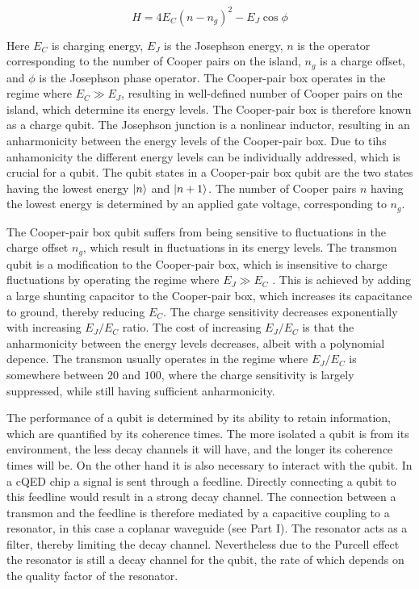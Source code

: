     \begin{equation}
      H=4 E_C (n - n_g)^2-E_J \cos \phi
      \label{eq:Cooper-pair box Hamiltonian}
    \end{equation}

    Here $E_C$ is charging energy, $E_J$ is the Josephson energy, $n$ is the operator corresponding to the number of Cooper pairs on the island, $n_g$ is a charge offset, and $\phi$ is the Josephson phase operator. The Cooper-pair box operates in the regime where $E_C \gg E_J$, resulting in well-defined number of Cooper pairs on the island, which determine its energy levels. The Cooper-pair box is therefore known as a charge qubit. The Josephson junction is a nonlinear inductor, resulting in an anharmonicity between the energy levels of the Cooper-pair box. Due to tihs anhamonicity the different energy levels can be individually addressed, which is crucial for a qubit. The qubit states in a Cooper-pair box qubit are the two states having the lowest energy $\ket{n}$ and $\ket{n+1}$. The number of Cooper pairs $n$ having the lowest energy is determined by an applied gate voltage, corresponding to $n_g$.

    The Cooper-pair box qubit suffers from being sensitive to fluctuations in the charge offset $n_g$, which result in fluctuations in its energy levels. The transmon qubit is a modification to the Cooper-pair box, which is insensitive to charge fluctuations by operating the regime where $E_J \gg E_C$ \cite{koch2007Transmon}. This is achieved by adding a large shunting capacitor to the Cooper-pair box, which increases its capacitance to ground, thereby reducing $E_C$. The charge sensitivity decreases exponentially with increasing $E_J/E_C$ ratio. The cost of increasing $E_J/E_C$ is that the anharmonicity between the energy levels decreases, albeit with a polynomial depence. The transmon usually operates in the regime where $E_J/E_C$ is somewhere between $20$ and $100$, where the charge sensitivity is largely suppressed, while still having sufficient anharmonicity.

    The performance of a qubit is determined by its ability to retain information, which are quantified by its coherence times. The more isolated a qubit is from its environment, the less decay channels it will have, and the longer its coherence times will be. On the other hand it is also necessary to interact with the qubit. In a cQED chip a signal is sent through a feedline. Directly connecting a qubit to this feedline would result in a strong decay channel. The connection between a transmon and the feedline is therefore mediated by a capacitive coupling to a resonator, in this case a coplanar waveguide (see Part I). The resonator acts as a filter, thereby limiting the decay channel. Nevertheless due to the Purcell effect the resonator is still a decay channel for the qubit, the rate of which depends on the quality factor of the resonator.

